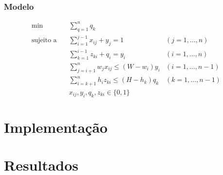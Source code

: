 \documentclass{beamer}
\begin{document}
\begin{frame}
\setcounter{equation}{0}
\frametitle {Modelo}

{\small
\begin{align}
\min \quad
& \sum_{q=1}^{n} q_k \\
\text{sujeito a}\quad
& \sum_{i=1}^{j-1} x_{ij} + y_j = 1 &  (j = 1, \dots, n)  \\
& \sum_{k=1}^{i-1} z_{ki} + q_i = y_i  & (i = 1, \dots, n) \\
& \sum_{j=i+1}^{n} w_j x_{ij} \leq (W - w_i)y_i  & (i = 1, \dots, n-1) \\
& \sum_{i=k+1}^{n} h_i z_{ki} \leq (H - h_k)q_k  & (k = 1, \dots, n-1) \\
& x_{ij}, y_i, q_k, z_{ki} \in \{0,1\}
\end{align} 
}
\end{frame}

\section{Implementação}


\section{Resultados}
\end{document}
